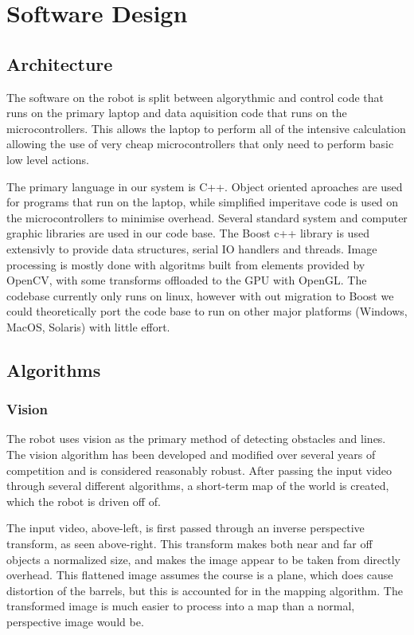 \section{Software Design}

\subsection{Architecture}

The software on the robot is split between algorythmic and control code that runs on the primary laptop and data aquisition code that runs on the microcontrollers. This allows the laptop to perform all of the intensive calculation allowing the use of very cheap microcontrollers that only need to perform basic low level actions.

The primary language in our system is C++. Object oriented aproaches are used for programs that run on the laptop, while simplified imperitave code is used on the microcontrollers to minimise overhead. Several standard system and computer graphic libraries are used in our code base. The Boost c++ library is used extensivly to provide data structures, serial IO handlers and threads. Image processing is mostly done with algoritms built from elements provided by OpenCV, with some transforms offloaded to the GPU with OpenGL. The codebase currently only runs on linux, however with out migration to Boost we could theoretically port the code base to run on other major platforms (Windows, MacOS, Solaris) with little effort.

\subsection{Algorithms}

\subsubsection{Vision}

The robot uses vision as the primary method of detecting obstacles and lines. The vision algorithm has been developed and modified over several years of competition and is considered reasonably robust. After passing the input video through several different algorithms, a short-term map of the world is created, which the robot is driven off of.

The input video, above-left, is first passed through an inverse perspective transform, as seen above-right. This transform makes both near and far off objects a normalized size, and makes the image appear to be taken from directly overhead. This flattened image assumes the course is a plane, which does cause distortion of the barrels, but this is accounted for in the mapping algorithm. The transformed image is much easier to process into a map than a normal, perspective image would be.

